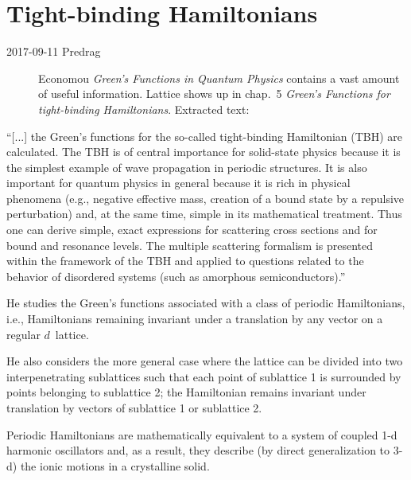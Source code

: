 \section{Tight-binding Hamiltonians}
\label{sect:TightBind}

\begin{description}
  \item[2017-09-11 Predrag]
Economou {\em {Green's Functions in Quantum Physics}}
contains a vast amount of useful information.
Lattice shows up in chap.~5 {\em Green's Functions
for tight-binding Hamiltonians}. Extracted text:
\end{description}

``[...] the Green's functions for the so-called tight-binding Hamiltonian
(TBH) are calculated. The TBH is of central importance for solid-state
physics because it is the simplest example of wave propagation in
periodic structures. It is also important for quantum physics in general
because it is rich in physical phenomena (e.g., negative effective mass,
creation of a bound state by a repulsive perturbation) and, at the same
time, simple in its mathematical treatment. Thus one can derive simple,
exact expressions for scattering cross sections and for bound and
resonance levels. The multiple scattering formalism is presented within
the framework of the TBH and applied to questions related to the behavior
of disordered systems (such as amorphous semiconductors).''

He studies the Green's functions associated with a class of periodic
Hamiltonians, i.e., Hamiltonians remaining invariant under a translation
by any vector on a regular $d$\dmn\ lattice.

He also considers the more general case where the lattice can be divided
into two interpenetrating sublattices such that each point of sublattice
1 is surrounded by points belonging to sublattice 2; the Hamiltonian
remains invariant under translation by vectors of sublattice 1 or
sublattice 2.

Periodic Hamiltonians are mathematically equivalent to a system of
coupled 1-d harmonic oscillators and, as a result, they describe (by
direct generalization to 3-d) the ionic motions in a crystalline solid.

